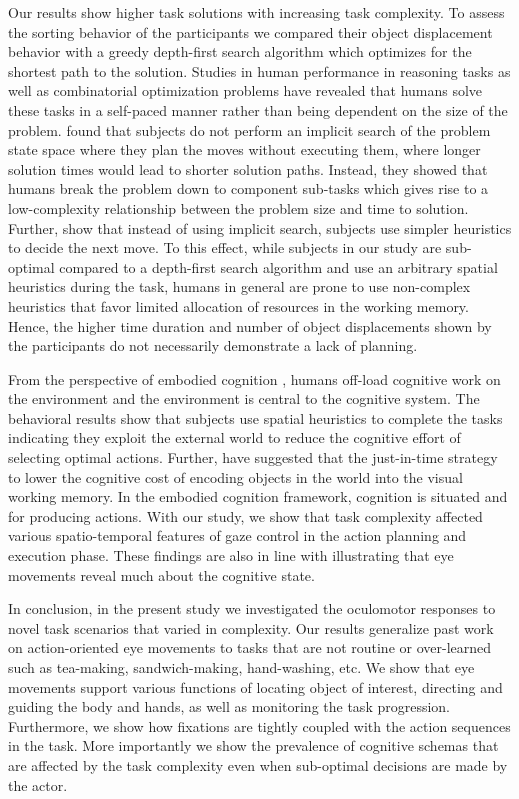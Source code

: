 Our results show higher task solutions with increasing task complexity. To assess the sorting behavior of the participants we compared their object displacement behavior with a greedy depth-first search algorithm which optimizes for the shortest path to the solution. Studies in human performance in reasoning tasks as well as combinatorial optimization problems \citep{MacGregor2011-yf} have revealed that humans solve these tasks in a self-paced manner rather than being dependent on the size of the problem. \citet{Pizlo2005-qi} found that subjects do not perform an implicit search of the problem state space where they plan the moves without executing them, where longer solution times would lead to shorter solution paths. Instead, they showed that humans break the problem down to component sub-tasks which gives rise to a low-complexity relationship between the problem size and time to solution. Further, \citet{Pizlo2005-qi} show that instead of using implicit search, subjects use simpler heuristics to decide the next move. To this effect, while subjects in our study are sub-optimal compared to a depth-first search algorithm and use an arbitrary spatial heuristics during the task, humans in general are prone to use non-complex heuristics that favor limited allocation of resources in the working memory. Hence, the higher time duration and number of object displacements shown by the participants do not necessarily demonstrate a lack of planning.

From the perspective of embodied cognition \citep{Wilson2002-mv, Ballard2013-lo, Van_der_Stigchel2020-qb}, humans off-load cognitive work on the environment and the environment is central to the cognitive system. The behavioral results show that subjects use spatial heuristics to complete the tasks indicating they exploit the external world to reduce the cognitive effort of selecting optimal actions. Further, \citet{Droll2007-bp} have suggested that the just-in-time strategy to lower the cognitive cost of encoding objects in the world into the visual working memory. In the embodied cognition framework, cognition is situated and for producing actions. With our study, we show that task complexity affected various spatio-temporal features of gaze control in the action planning and execution phase. These findings are also in line with \citet{Konig2016-ew} illustrating that eye movements reveal much about the cognitive state. 

In conclusion, in the present study we investigated the oculomotor responses to novel task scenarios that varied in complexity. Our results generalize past work on action-oriented eye movements to tasks that are not routine or over-learned such as tea-making, sandwich-making, hand-washing, etc. We show that eye movements support various functions of locating object of interest, directing and guiding the body and hands, as well as monitoring the task progression. Furthermore, we show how fixations are tightly coupled with the action sequences in the task. More importantly we show the prevalence of cognitive schemas that are affected by the task complexity even when sub-optimal decisions are made by the actor. 



